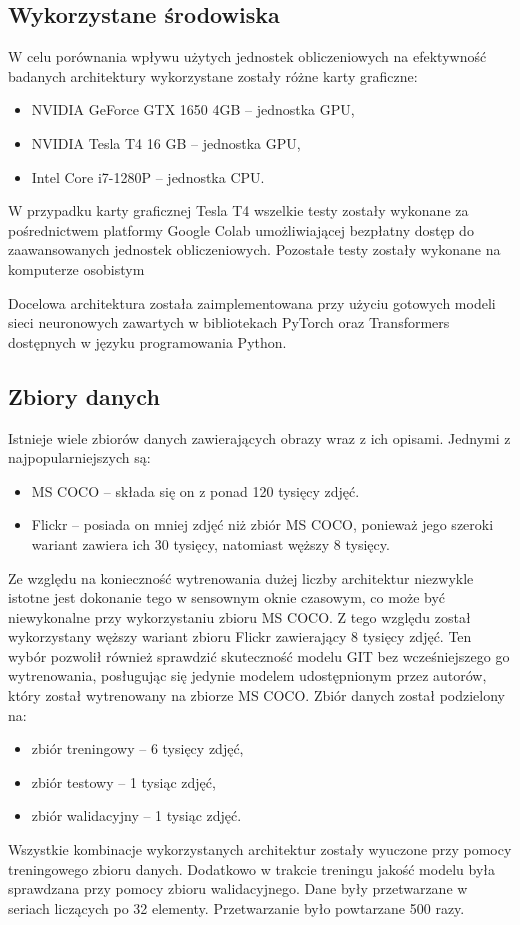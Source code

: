 \subsection{Wykorzystane środowiska}
W celu porównania wpływu użytych jednostek obliczeniowych na efektywność badanych architektury wykorzystane zostały różne karty graficzne:
\begin{itemize}
    \item NVIDIA GeForce GTX 1650 4GB -- jednostka GPU,
    \item NVIDIA Tesla T4 16 GB -- jednostka GPU,
    \item Intel Core i7-1280P -- jednostka CPU.
\end{itemize}
W przypadku karty graficznej Tesla T4 wszelkie testy zostały wykonane za pośrednictwem platformy Google Colab umożliwiającej bezpłatny dostęp do zaawansowanych jednostek obliczeniowych. Pozostałe testy zostały wykonane na komputerze osobistym

Docelowa architektura została zaimplementowana przy użyciu gotowych modeli sieci neuronowych zawartych w bibliotekach PyTorch \cite{pytorch} oraz Transformers \cite{wolf-etal-2020-transformers} dostępnych w języku programowania Python.
\subsection{Zbiory danych}
Istnieje wiele zbiorów danych zawierających obrazy wraz z ich opisami. Jednymi z najpopularniejszych są:
\begin{itemize}
    \item MS COCO \cite{mscoco} -- składa się on z ponad 120 tysięcy zdjęć.
    \item Flickr \cite{flickr30k} -- posiada on mniej zdjęć niż zbiór MS COCO, ponieważ jego szeroki wariant zawiera ich 30 tysięcy, natomiast węższy 8 tysięcy.
\end{itemize}
Ze względu na konieczność wytrenowania dużej liczby architektur niezwykle istotne jest dokonanie tego w sensownym oknie czasowym, co może być niewykonalne przy wykorzystaniu zbioru MS COCO. Z tego względu został wykorzystany węższy wariant zbioru Flickr zawierający 8 tysięcy zdjęć. Ten wybór pozwolił również sprawdzić skuteczność modelu GIT bez wcześniejszego go wytrenowania, posługując się jedynie modelem udostępnionym przez autorów, który został wytrenowany na zbiorze MS COCO.
Zbiór danych został podzielony na:
\begin{itemize}
    \item zbiór treningowy -- 6 tysięcy zdjęć,
    \item zbiór testowy -- 1 tysiąc zdjęć,
    \item zbiór walidacyjny -- 1 tysiąc zdjęć.
\end{itemize}

\noindent Wszystkie kombinacje wykorzystanych architektur zostały wyuczone przy pomocy treningowego zbioru danych. Dodatkowo w trakcie treningu jakość modelu była sprawdzana przy pomocy zbioru walidacyjnego. Dane były przetwarzane w seriach liczących po 32 elementy. Przetwarzanie było powtarzane 500 razy.
